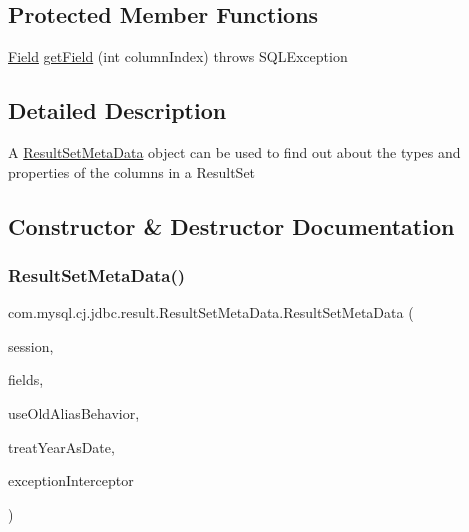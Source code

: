 \subsection*{Protected Member Functions}
\begin{DoxyCompactItemize}
\item 
\mbox{\hyperlink{classcom_1_1mysql_1_1cj_1_1result_1_1_field}{Field}} \mbox{\hyperlink{classcom_1_1mysql_1_1cj_1_1jdbc_1_1result_1_1_result_set_meta_data_a7c21fafb34354c4ab2a14b390756f85c}{get\+Field}} (int column\+Index)  throws S\+Q\+L\+Exception 
\end{DoxyCompactItemize}


\subsection{Detailed Description}
A \mbox{\hyperlink{classcom_1_1mysql_1_1cj_1_1jdbc_1_1result_1_1_result_set_meta_data}{Result\+Set\+Meta\+Data}} object can be used to find out about the types and properties of the columns in a Result\+Set 

\subsection{Constructor \& Destructor Documentation}
\mbox{\label{classcom_1_1mysql_1_1cj_1_1jdbc_1_1result_1_1_result_set_meta_data_af01bb104a1e170fc5592c8eac2951f74}} 
\subsubsection{\texorpdfstring{Result\+Set\+Meta\+Data()}{ResultSetMetaData()}}
{\footnotesize\ttfamily com.\+mysql.\+cj.\+jdbc.\+result.\+Result\+Set\+Meta\+Data.\+Result\+Set\+Meta\+Data (\begin{DoxyParamCaption}\item[{\mbox{\hyperlink{interfacecom_1_1mysql_1_1cj_1_1_session}{Session}}}]{session,  }\item[{\mbox{\hyperlink{classcom_1_1mysql_1_1cj_1_1result_1_1_field}{Field}} \mbox{[}$\,$\mbox{]}}]{fields,  }\item[{boolean}]{use\+Old\+Alias\+Behavior,  }\item[{boolean}]{treat\+Year\+As\+Date,  }\item[{\mbox{\hyperlink{interfacecom_1_1mysql_1_1cj_1_1exceptions_1_1_exception_interceptor}{Exception\+Interceptor}}}]{exception\+Interceptor }\end{DoxyParamCaption})}

